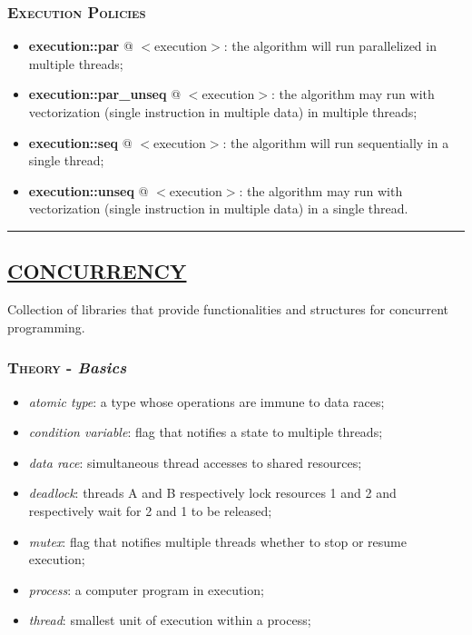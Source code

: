 \documentclass[10pt]{article}
\begin{document}
\begin{multicols*}{4}
{\subsubsection*{\textsc{Execution Policies}} 
\begin{itemize}[leftmargin=*,topsep=0.25pt]
  \setlength\itemsep{-1.8pt}
	\item  {\textbf{execution::par}} @ $<$execution$>$: the algorithm will run parallelized in multiple threads;
\item  {\textbf{execution::par\_unseq}} @ $<$execution$>$: the algorithm may run with vectorization (single instruction in multiple data) in multiple threads; 
	\item  {\textbf{execution::seq}} @ $<$execution$>$: the algorithm will run sequentially in a single thread;
\item  {\textbf{execution::unseq}} @ $<$execution$>$: the algorithm may run with vectorization (single instruction in multiple data) in a single thread.

\end{itemize}



}

\par\noindent\rule{197pt}{0.4pt}

{\color{Blue}
\subsection*{\href{https://en.cppreference.com/w/cpp/thread}{\underline{CONCURRENCY}}}	
\noindent
Collection of libraries that provide functionalities and structures for concurrent programming.

\subsubsection*{\textsc{Theory} - \emph{Basics}} 
\begin{itemize}[leftmargin=*,topsep=0.25pt]
  \setlength\itemsep{-1.8pt}
	\item  \emph{atomic type}: a type whose operations are immune to data races;
	\item  \emph{condition variable}: flag that notifies a state to multiple threads;  
	\item  \emph{data race}: simultaneous thread accesses to shared resources;
	\item  \emph{deadlock}: threads A and B respectively lock resources 1 and 2 and respectively wait for 2 and 1 to be released;
	\item  \emph{mutex}: flag that notifies multiple threads whether to stop or resume execution; 
	\item  \emph{process}: a computer program in execution;
	\item  \emph{thread}: smallest unit of execution within a process;
\end{itemize}

}
\end{multicols*}
\end{document}
